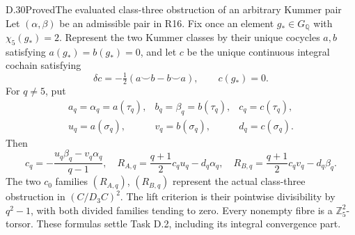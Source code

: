 \begin{statement}{D.30}{Proved}{The evaluated class-three obstruction of an arbitrary Kummer pair}
Let \((\alpha,\beta)\) be an admissible
pair in R16. Fix once an element
\(g_*\in G_{\mathbb Q}\) with
\(\chi_5(g_*)=2\). Represent the two
Kummer classes by their unique cocycles
\(a,b\) satisfying
\(a(g_*)=b(g_*)=0\), and let \(c\)
be the unique continuous integral
cochain satisfying
\[
 \delta c=-\tfrac12(a\smile b-b\smile a),
                   \qquad c(g_*)=0.             \tag{D.30.1}
\]
For \(q\ne5\), put
\[
\begin{array}{lll}
 a_q=\alpha_q=a(\tau_q),&
 b_q=\beta_q=b(\tau_q),&c_q=c(\tau_q),\\
 u_q=a(\sigma_q),&v_q=b(\sigma_q),&d_q=c(\sigma_q).
\end{array}
\]
Then
\[
 c_q=-\frac{u_q\beta_q-v_q\alpha_q}{q-1},
 \quad
 R_{A,q}=\frac{q+1}{2}c_qu_q-d_q\alpha_q,
 \quad
 R_{B,q}=\frac{q+1}{2}c_qv_q-d_q\beta_q.          \tag{D.30.2}
\]
The two \(c_0\) families \((R_{A,q})\),
\((R_{B,q})\) represent the actual
class-three obstruction in \((C/D_3C)^2\).
The lift criterion is their pointwise
divisibility by \(q^2-1\), with both
divided families tending to zero.
Every nonempty fibre is a
\(\mathbb Z_5^2\)-torsor. These formulas
settle Task D.2, including its integral
convergence part.
\end{statement}
